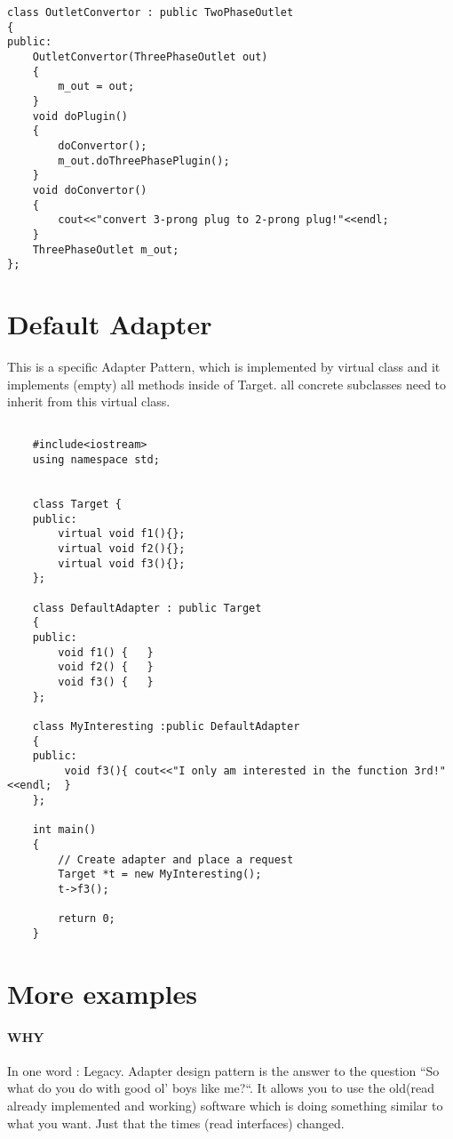 \documentclass{book}
\begin{document}
\begin{lstlisting}
class OutletConvertor : public TwoPhaseOutlet  
{  
public:  
    OutletConvertor(ThreePhaseOutlet out)  
    {  
        m_out = out;  
    }  
    void doPlugin()  
    {  
        doConvertor();  
        m_out.doThreePhasePlugin();  
    }  
    void doConvertor()  
    {  
        cout<<"convert 3-prong plug to 2-prong plug!"<<endl;  
    }  
    ThreePhaseOutlet m_out;  
};  
\end{lstlisting}

\section{Default Adapter}\label{AdapterPatternDefault}
This is a specific Adapter Pattern, which is implemented by virtual class and it implements (empty) all methods inside of Target. all concrete subclasses need to inherit from this virtual class.
\begin{lstlisting}

    #include<iostream>  
    using namespace std;  
      
      
    class Target {   
    public:  
        virtual void f1(){};   
        virtual void f2(){};   
        virtual void f3(){};     
    };  
      
    class DefaultAdapter : public Target   
    {   
    public:  
        void f1() {   }   
        void f2() {   }   
        void f3() {   }   
    };  
      
    class MyInteresting :public DefaultAdapter  
    {   
    public:  
         void f3(){ cout<<"I only am interested in the function 3rd!"<<endl;  }   
    };  
      
    int main()  
    {  
        // Create adapter and place a request  
        Target *t = new MyInteresting();  
        t->f3();  
      
        return 0;  
    }  

\end{lstlisting}

\section{More examples}
\paragraph{WHY}
In one word : Legacy.
Adapter design pattern is the answer to the question “So what do you do with good ol’ boys like me?“.
It allows you to use the old(read already implemented and working) software which is doing something similar to what you want. Just that the times (read interfaces) changed.
\end{document}
